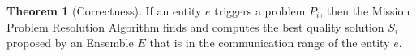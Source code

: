 \documentclass[journal]{IEEEtran}
\theoremstyle{definition}
\newtheorem{theorem}{Theorem}
\begin{document}





\begin{theorem}[Correctness]
If an entity $e$ triggers a problem $P_i$, then the Mission Problem Resolution Algorithm finds and computes the best quality solution $S_i$  proposed by an Ensemble $E$ that is in the communication range of the entity $e$.
\end{theorem}
\end{document}
